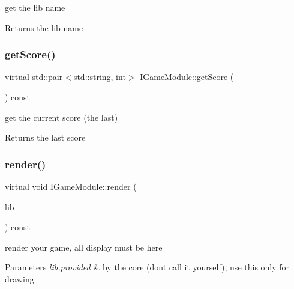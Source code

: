 get the lib name 

\begin{DoxyReturn}{Returns}
the lib name 
\end{DoxyReturn}
\mbox{\label{class_i_game_module_a10133f024c107b05c37510facf27c21c}} 
\subsubsection{\texorpdfstring{get\+Score()}{getScore()}}
{\footnotesize\ttfamily virtual std\+::pair$<$std\+::string, int$>$ I\+Game\+Module\+::get\+Score (\begin{DoxyParamCaption}{ }\end{DoxyParamCaption}) const\hspace{0.3cm}{\ttfamily [pure virtual]}}



get the current score (the last) 

\begin{DoxyReturn}{Returns}
the last score 
\end{DoxyReturn}
\mbox{\label{class_i_game_module_a6a2489a66aaea6255e35b6f025d08460}} 
\subsubsection{\texorpdfstring{render()}{render()}}
{\footnotesize\ttfamily virtual void I\+Game\+Module\+::render (\begin{DoxyParamCaption}\item[{\hyperlink{class_i_display_module}{I\+Display\+Module} \&}]{lib }\end{DoxyParamCaption}) const\hspace{0.3cm}{\ttfamily [pure virtual]}}



render your game, all display must be here 


\begin{DoxyParams}{Parameters}
{\em lib,provided} & by the core (don\textquotesingle{}t call it yourself), use this only for drawing \\
\hline
\end{DoxyParams}
\mbox{\label{class_i_game_module_a03f9bf4061f7f52356a768f984c372ae}} 
